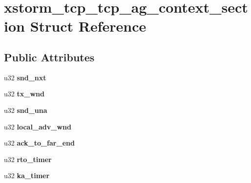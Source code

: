 \hypertarget{structxstorm__tcp__tcp__ag__context__section}{
\section{xstorm\_\-tcp\_\-tcp\_\-ag\_\-context\_\-section Struct Reference}
\label{structxstorm__tcp__tcp__ag__context__section}
}
\subsection*{Public Attributes}
\begin{DoxyCompactItemize}
\item 
\hypertarget{structxstorm__tcp__tcp__ag__context__section_aa6b6dd9a3fc2f36dabbf448705639287}{
u32 {\bfseries snd\_\-nxt}}
\label{structxstorm__tcp__tcp__ag__context__section_aa6b6dd9a3fc2f36dabbf448705639287}

\item 
\hypertarget{structxstorm__tcp__tcp__ag__context__section_a1a1ca4646f4dae23a3659d166e99fc56}{
u32 {\bfseries tx\_\-wnd}}
\label{structxstorm__tcp__tcp__ag__context__section_a1a1ca4646f4dae23a3659d166e99fc56}

\item 
\hypertarget{structxstorm__tcp__tcp__ag__context__section_af210fbc9e7e454d32e6ba64d4d878cda}{
u32 {\bfseries snd\_\-una}}
\label{structxstorm__tcp__tcp__ag__context__section_af210fbc9e7e454d32e6ba64d4d878cda}

\item 
\hypertarget{structxstorm__tcp__tcp__ag__context__section_a8b16dab385fb46f997818024bc6f6a7d}{
u32 {\bfseries local\_\-adv\_\-wnd}}
\label{structxstorm__tcp__tcp__ag__context__section_a8b16dab385fb46f997818024bc6f6a7d}

\item 
\hypertarget{structxstorm__tcp__tcp__ag__context__section_a3f50f3084782a540ad6c89dff4c66c8b}{
u32 {\bfseries ack\_\-to\_\-far\_\-end}}
\label{structxstorm__tcp__tcp__ag__context__section_a3f50f3084782a540ad6c89dff4c66c8b}

\item 
\hypertarget{structxstorm__tcp__tcp__ag__context__section_ad00093dab9207b868d28d33c72549167}{
u32 {\bfseries rto\_\-timer}}
\label{structxstorm__tcp__tcp__ag__context__section_ad00093dab9207b868d28d33c72549167}

\item 
\hypertarget{structxstorm__tcp__tcp__ag__context__section_ae9c12d184cc64ff25e062e69a55f8d8e}{
u32 {\bfseries ka\_\-timer}}
\label{structxstorm__tcp__tcp__ag__context__section_ae9c12d184cc64ff25e062e69a55f8d8e}


\end{DoxyCompactItemize}
